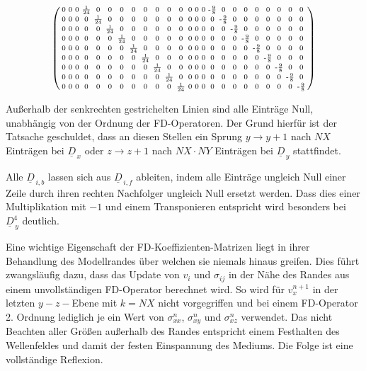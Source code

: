 \documentclass[pdftex,a4paper,parskip,listof=totoc,bibliography=totoc,onehalfspacing,12pt]{scrreprt}
\begin{document}
\begin{align*}
\begin{psmallmatrix}
0 & 0 & 0 & \frac{1}{24} & 0 & 0 & 0 & 0 & 0 & 0 & 0 & 0 & 0 & 0 & 0 & \text{-}\frac{9}{8} & 0 & 0 & 0 & 0 & 0 & 0 & 0 & 0 \\
0 & 0 & 0 & 0 & \frac{1}{24} & 0 & 0 & 0 & 0 & 0 & 0 & 0 & 0 & 0 & 0 & 0 & \text{-}\frac{9}{8} & 0 & 0 & 0 & 0 & 0 & 0 & 0 \\
0 & 0 & 0 & 0 & 0 & \frac{1}{24} & 0 & 0 & 0 & 0 & 0 & 0 & 0 & 0 & 0 & 0 & 0 & \text{-}\frac{9}{8} & 0 & 0 & 0 & 0 & 0 & 0 \\
0 & 0 & 0 & 0 & 0 & 0 & \frac{1}{24} & 0 & 0 & 0 & 0 & 0 & 0 & 0 & 0 & 0 & 0 & 0 & \text{-}\frac{9}{8} & 0 & 0 & 0 & 0 & 0 \\
0 & 0 & 0 & 0 & 0 & 0 & 0 & \frac{1}{24} & 0 & 0 & 0 & 0 & 0 & 0 & 0 & 0 & 0 & 0 & 0 & \text{-}\frac{9}{8} & 0 & 0 & 0 & 0 \\
0 & 0 & 0 & 0 & 0 & 0 & 0 & 0 & \frac{1}{24} & 0 & 0 & 0 & 0 & 0 & 0 & 0 & 0 & 0 & 0 & 0 & \text{-}\frac{9}{8} & 0 & 0 & 0 \\
0 & 0 & 0 & 0 & 0 & 0 & 0 & 0 & 0 & \frac{1}{24} & 0 & 0 & 0 & 0 & 0 & 0 & 0 & 0 & 0 & 0 & 0 & \text{-}\frac{9}{8} & 0 & 0 \\
0 & 0 & 0 & 0 & 0 & 0 & 0 & 0 & 0 & 0 & \frac{1}{24} & 0 & 0 & 0 & 0 & 0 & 0 & 0 & 0 & 0 & 0 & 0 & \text{-}\frac{9}{8} & 0 \\
0 & 0 & 0 & 0 & 0 & 0 & 0 & 0 & 0 & 0 & 0 & \frac{1}{24} & 0 & 0 & 0 & 0 & 0 & 0 & 0 & 0 & 0 & 0 & 0 & \text{-}\frac{9}{8} \\
\end{psmallmatrix}
\end{align*}

Außerhalb der senkrechten gestrichelten Linien sind alle Einträge Null, unabhängig von der Ordnung der FD-Operatoren. Der Grund hierfür ist der Tatsache geschuldet, dass an diesen Stellen ein Sprung $y\rightarrow y+1$ nach $NX$ Einträgen bei $\underline{D}_{\,x}$ oder $z\rightarrow z+1$ nach $NX \cdot NY$ Einträgen bei $\underline{D}_{\,y}$ stattfindet.

Alle $\underline{D}_{\,i,b}$ lassen sich aus $\underline{D}_{\,i,f}$ ableiten, indem alle Einträge ungleich Null einer Zeile durch ihren rechten Nachfolger ungleich Null ersetzt werden. Dass dies einer Multiplikation mit $-1$ und einem Transponieren entspricht wird besonders bei $\underline{D}_{\,y}^4$ deutlich.


Eine wichtige Eigenschaft der FD-Koeffizienten-Matrizen liegt in ihrer Behandlung des Modellrandes über welchen sie niemals hinaus greifen. Dies führt zwangsläufig dazu, dass das Update von $v_i$ und $\sigma_{ij}$ in der Nähe des Randes aus einem unvollständigen FD-Operator berechnet wird. So wird für $v_x^{n+1}$ in der letzten $y-z-$Ebene mit $k=NX$ nicht vorgegriffen und bei einem FD-Operator 2. Ordnung lediglich je ein Wert von $\sigma_{xx}^n$, $\sigma_{xy}^n$ und $\sigma_{xz}^n$ verwendet. Das nicht Beachten aller Größen außerhalb des Randes entspricht einem Festhalten des Wellenfeldes und damit der festen Einspannung des Mediums. Die Folge ist eine vollständige Reflexion.
\end{document}
